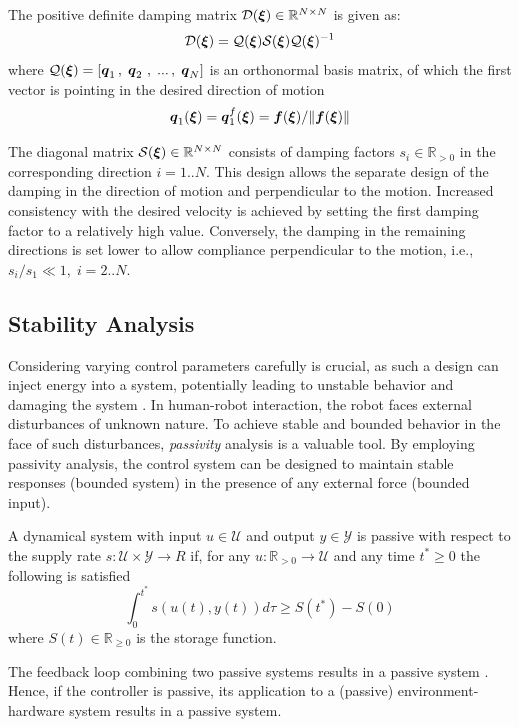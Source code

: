 The positive definite damping matrix $\mathcal{D}(\boldsymbol{\xi}) \in \mathbb{R}^{N \times N}$ is given as:
\begin{equation}
   \matd {D}(\vecs \xi) = \matd{Q}(\vecs\xi)\matd{S}(\vecs\xi) \matd{Q} (\vecs \xi)^{-1}
\label{eq:damping_matrix}
\end{equation}
where $\mathcal{Q}(\boldsymbol{\xi}) = \left[ \boldsymbol{q}_1 \, , \; \boldsymbol{q}_2\ , \; ... \, , \; \boldsymbol{q}_N \right] $ is an orthonormal basis matrix, of which the first vector is pointing in the desired direction of motion
\begin{equation}
    \vecs q_1(\vecs \xi) = \vecs q_1^f(\vecs \xi) = \vect f({\vecs \xi}) / \lVert \vect f({\vecs \xi}) \rVert \label{eq:velocity_unit_vector}
\end{equation}

The diagonal matrix $\mathcal{S}(\boldsymbol{\xi}) \in \mathbb{R}^{N \times N}$ consists of damping factors $s_i \in \mathbb{R}_{>0}$ in the corresponding direction $i = 1 .. N$.
This design allows the separate design of the damping in the direction of motion and perpendicular to the motion.
Increased consistency with the desired velocity is achieved by setting the first damping factor to a relatively high value. Conversely, the damping in the remaining directions is set lower to allow compliance perpendicular to the motion, i.e., $s_i / s_1 \ll 1, \; i = 2 .. N$.

\iflong
\subsection{Stability Analysis} \label{sec:trad_passive}
Considering varying control parameters carefully is crucial, as such a design can inject energy into a system, potentially leading to unstable behavior and damaging the system \cite{ferraguti2013tank}.
In human-robot interaction, the robot faces external disturbances of unknown nature. To achieve stable and bounded behavior in the face of such disturbances, \textit{passivity} analysis is a valuable tool. By employing passivity analysis, the control system can be designed to maintain stable responses (bounded system) in the presence of any external force (bounded input). 

\begin{definition} \label{def:passivity}
	A dynamical system with input $ u \in \mathcal{U}$ and output $y \in \mathcal{Y}$ is passive with respect to the supply rate $s : \mathcal{U} \times \mathcal{Y} \rightarrow{R}$ if, for any $u: \mathbb{R}_{>0} \rightarrow \mathcal{U}$ and any time $t^* \geq 0$ the following is satisfied
  \begin{equation}
	  \int_0^{t^*} s \left( u(t),  y (t) \right) d \tau \geq S(t^*) - S(0) 
  \end{equation}
  where $S(t) \in \mathbb{R}_{\geq 0}$ is the storage function.
\end{definition}

The feedback loop combining two passive systems results in a passive system \cite{sepulchre2012constructive}. Hence, if the controller is passive, its application to a (passive) environment-hardware system results in a passive system.
\fi